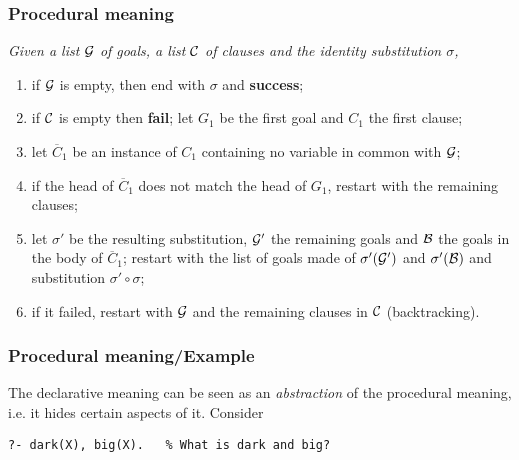 %
\begin{frame}
\frametitle{Procedural meaning}

{\it
Given a list \(\cal G\) of goals, a list \(\cal C\) of clauses and
the identity substitution \(\sigma\),
\begin{enumerate}
 
  \item if \(\cal G\) is empty, then end with \(\sigma\) and
    \textbf{success};

  \item if \(\cal C\) is empty then \textbf{fail}; let \(G_1\) be the
    first goal and \(C_1\) the first clause;

  \item let \(\overline{C}_1\) be an instance of \(C_1\) containing
    no variable in common with \({\cal G}\);

  \item if the head of \(\overline{C}_1\) does not match the head of
    \(G_1\), restart with the remaining clauses;
    
  \item let \(\sigma'\) be the resulting substitution, \({\cal G}'\)
    the remaining goals and \(\cal B\) the goals in the body of
    \(\overline{C}_1\); restart with the list of goals made of
    \(\sigma'({\cal G}')\) and \(\sigma'({\cal B})\) and substitution
    \(\sigma' \circ \sigma\);

  \item if it failed, restart with \(\cal G\) and the remaining
    clauses in \(\cal C\) \textnormal{(backtracking)}.

\end{enumerate}
}

\end{frame}

%
\begin{frame}[containsverbatim]
\frametitle{Procedural meaning/Example}

The declarative meaning can be seen as an \emph{abstraction} of the
procedural meaning, i.e. it hides certain aspects of it. Consider


{\small
\begin{verbatim}
?- dark(X), big(X).   % What is dark and big?
\end{verbatim}
}

\end{frame}

